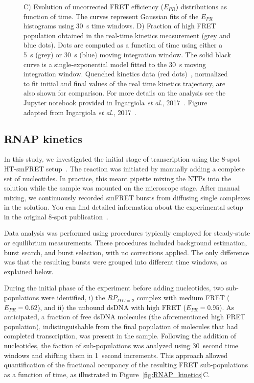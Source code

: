 \begin{figure}
{C) Evolution of uncorrected FRET efficiency ($E_{PR}$) distributions as function of time.
The curves represent Gaussian fits of the $E_{PR}$ histograms using 30~s time windows.
D) Fraction of high FRET population obtained in the real-time kinetics measurement (grey and blue dots).
Dots are computed as a function of time using either a 5~s (grey) or 30~s (blue) moving integration window.
The solid black curve is a single-exponential model fitted to the 30~s moving integration window.
Quenched kinetics data (red dots)~\cite{lerner_PNAS_2016}, normalized to fit initial and final values of
the real time kinetics trajectory, are also shown for comparison.
For more details on the analysis see the Jupyter notebook provided in Ingargiola \textit{et al.}, 2017~\cite{ingargiola_PLOS1_2016}.
Figure adapted from Ingargiola \textit{et al.}, 2017~\cite{ingargiola_PLOS1_2016}.
}
\end{figure}

\subsection{RNAP kinetics}
\label{sec:kinetics_analysis}

In this study, we investigated the initial stage of transcription using the 8-spot \ac{HT-smFRET} setup~\cite{ingargiola_PLOS1_2016}. 
The reaction was initiated by manually adding a complete set of nucleotides. 
In practice, this meant pipette mixing the \ac{NTP}s into the solution while the sample was mounted on the microscope stage. 
After manual mixing, we continuously recorded smFRET bursts from diffusing single complexes in the solution. 
You can find detailed information about the experimental setup in the original 8-spot publication~\cite{ingargiola_PLOS1_2016}.

Data analysis was performed using procedures typically employed for steady-state or equilibrium measurements. 
These procedures included background estimation, burst search, and burst selection, with no corrections applied. 
The only difference was that the resulting bursts were grouped into different time windows, as explained below.

During the initial phase of the experiment before adding nucleotides, two sub-populations were identified, i) the $RP_{ITC=2}$ complex with medium FRET ($E_{PR} = 0.62$), and ii) the unbound \ac{dsDNA} with high FRET ($E_{PR} = 0.95$).
As anticipated, a fraction of free \ac{dsDNA} molecules (the aforementioned high FRET population), indistinguishable from the final population of molecules that had completed transcription, was present in the sample.
Following the addition of nucleotides, the faction of sub-populations was analyzed using 30~second time windows and shifting them in 1~second increments. 
This approach allowed quantification of the fractional occupancy of the resulting FRET sub-populations as a function of time, as illustrated in Figure~\ref{fig:RNAP_kinetics}C.

